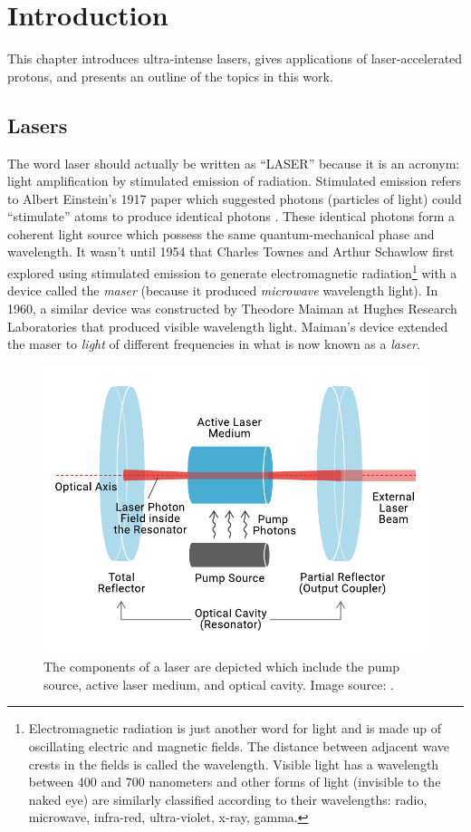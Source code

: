 \chapter{Introduction} \label{ch:1}
This chapter introduces ultra-intense lasers, gives applications of laser-accelerated protons, and presents an outline of the topics in this work.

\section{Lasers} \label{sec:lasers}

The word laser should actually be written as ``LASER'' because it is an acronym: light amplification by stimulated emission of radiation. Stimulated emission refers to Albert Einstein's 1917 paper which suggested photons (particles of light) could ``stimulate'' atoms to produce identical photons \cite{Einstein_1917_Quantum}. These identical photons form a coherent light source which possess the same quantum-mechanical phase and wavelength. It wasn't until 1954 that Charles Townes and Arthur Schawlow first explored using stimulated emission to generate electromagnetic radiation\footnote{Electromagnetic radiation is just another word for light and is made up of oscillating electric and magnetic fields. The distance between adjacent wave crests in the fields is called the wavelength. Visible light has a wavelength between 400 and 700 nanometers and other forms of light (invisible to the naked eye) are similarly classified according to their wavelengths: radio, microwave, infra-red, ultra-violet, x-ray, gamma.} with a device called the \emph{maser} (because it produced \emph{microwave} wavelength light). In 1960, a similar device was constructed by Theodore Maiman at Hughes Research Laboratories that produced visible wavelength light\cite{Maiman_1960_Nature}. Maiman's device extended the maser to \emph{light} of different frequencies in what is now known as a \emph{laser}.

\begin{figure}
	\centering
	\includegraphics[width=0.75\linewidth]{planning/images/laser_gain.pdf}
	\caption{The components of a laser are depicted which include the pump source, active laser medium, and optical cavity. Image source: \cite{MeetOpticsPost}.}
	\label{fig:laser_gain}
\end{figure}

